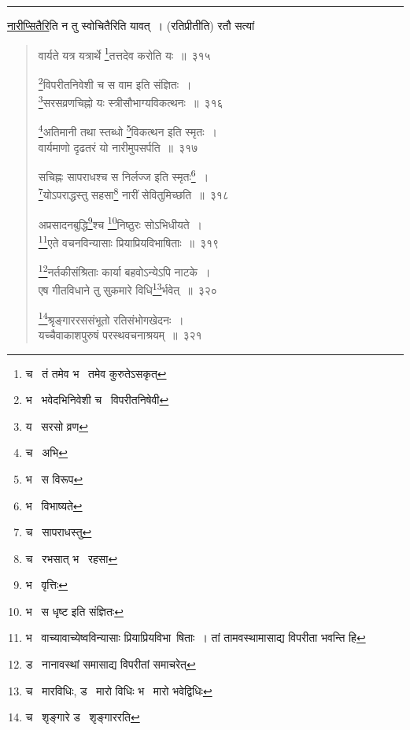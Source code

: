 \documentclass[11pt, openany]{book}
\begin{document}
\hrule

\vspace{2mm}
\noindent
\underline{नारीप्सितैरि}ति न तु स्वोचितैरिति यावत्~। (रतिप्रीतीति) रतौ सत्यां 

\newpage

\begin{quote}
{\na वार्यते यत्र यत्रार्थे \renewcommand{\thefootnote}{1}\footnote{च \textendash\  तं तमेव भ \textendash\  तमेव कुरुतेऽसकृत्}तत्तदेव करोति यः~॥~३१५

\renewcommand{\thefootnote}{2}\footnote{भ \textendash\  भवेदभिनिवेशी च \textendash\  विपरीतनिषेवी}विपरीतनिवेशी च स वाम इति संज्ञितः~।\\
\renewcommand{\thefootnote}{3}\footnote{य \textendash\  सरसो व्रण}सरसव्रणचिह्नो यः स्त्रीसौभाग्यविकत्थनः~॥~३१६

\renewcommand{\thefootnote}{4}\footnote{च \textendash\  अभि}अतिमानी तथा स्तब्धो \renewcommand{\thefootnote}{5}\footnote{भ \textendash\  स विरूप}विकत्थन इति स्मृतः~।\\
वार्यमाणो दृढतरं यो नारीमुपसर्पति~॥~३१७

सचिह्नः सापराधश्च स निर्लज्ज इति स्मृतः\renewcommand{\thefootnote}{6}\footnote{भ \textendash\  विभाष्यते}~।\\
\renewcommand{\thefootnote}{7}\footnote{च \textendash\  सापराधस्तु}योऽपराद्धस्तु सहसा\renewcommand{\thefootnote}{8}\footnote{च \textendash\  रभसात् भ \textendash\  रहसा} नारीं सेवितुमिच्छति~॥~३१८

अप्रसादनबुद्धि\renewcommand{\thefootnote}{9}\footnote{भ \textendash\  वृत्तिः}श्च \renewcommand{\thefootnote}{10}\footnote{भ \textendash\  स धृष्ट इति संज्ञितः}निष्ठुरः सोऽभिधीयते~।\\
\renewcommand{\thefootnote}{11}\footnote{भ \textendash\  वाच्यावाच्येष्वविन्यासाः प्रियाप्रियविभा\textendash\ षिताः~। तां तामवस्थामासाद्य विपरीता भवन्ति हि}एते वचनविन्यासाः प्रियाप्रियविभाषिताः~॥~३१९

\renewcommand{\thefootnote}{12}\footnote{ड \textendash\  नानावस्थां समासाद्य विपरीतां समाचरेत्}नर्तकीसंश्रिताः कार्या बहवोऽन्येऽपि नाटके~।\\
एष गीतविधाने तु सुकमारे विधि\renewcommand{\thefootnote}{13}\footnote{च \textendash\  मारविधिः, ड \textendash\  मारो विधिः भ \textendash\  मारो भवेद्विधिः}र्भवेत्~॥~३२०

\renewcommand{\thefootnote}{14}\footnote{च \textendash\  शृङ्गारे ड \textendash\  शृङ्गाररति}श्रृङ्गाररससंभूतो रतिसंभोगखेदनः~।\\
यच्चैवाकाशपुरुषं परस्थवचनाश्रयम्~॥~३२१}
\end{quote}
\end{document}
